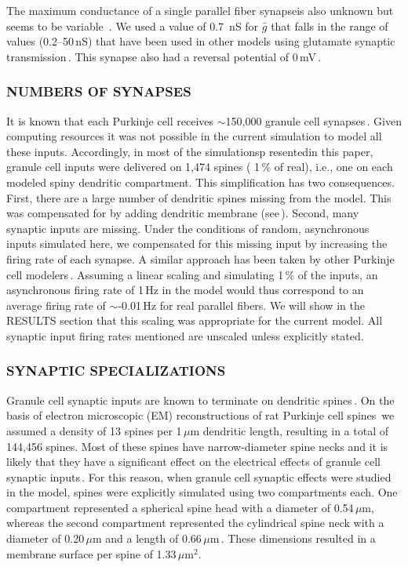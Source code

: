 \documentclass[12pt]{article}
\begin{document}
The maximum conductance of a
single parallel fiber synapseis also unknown but seems to be variable
\,\cite{Hirano:1986fv, Ito:1989dz}. We used a value of 0.7\,
nS for $\bar g$ that falls in the range of values (0.2--50\,nS) that have been
used in other models using glutamate synaptic transmission\,\cite{R:1989cr, W:1991qa, Miller:1985mi, Rapp-M:1992kx, Wehmeier:1989pi, Wilson:1989ff, Zador:1990lh}.
 This synapse also had a reversal
potential of 0\,mV\,\cite{Cull-Candy:1989oq, Mayer:1987kl}.

\subsubsection*{NUMBERS OF SYNAPSES}

It is known that each Purkinje cell receives
$\sim$150,000 granule cell synapses\,\cite{Harvey:1991xz}.
Given computing resources it was not possible in the
current simulation to model all these inputs. Accordingly, in most
of the simulationsp resentedin this paper, granule cell inputs were
delivered on 1,474 spines ( 1\,\% of real), i.e., one on each modeled
spiny dendritic compartment. This simplification has two consequences.
First, there are a large number of dendritic spines missing
from the model. This was compensated for by adding dendritic
membrane (see\,\cite{R:1989cr, Rapp-M:1992kx}).
Second, many synaptic inputs are missing. Under the conditions
of random, asynchronous inputs simulated here, we compensated
for this missing  input by increasing the firing rate of each synapse.
A similar approach has been taken by other Purkinje cell modelers\,\cite{Rapp-M:1992kx}.
Assuming a linear scaling and simulating 1\,\%
of the inputs, an asynchronous firing rate of 1\,Hz in the model
would thus correspond to an average firing rate of $\sim$-0.01\,Hz for
real parallel fibers. We will show in the RESULTS section that this
scaling was appropriate for the current model. All synaptic input
firing rates mentioned are unscaled unless explicitly stated.

\subsubsection*{SYNAPTIC SPECIALIZATIONS}

Granule cell synaptic inputs are
known to terminate on dendritic spines\,\cite{Harvey:1991xz, Palay:1974fk}.
On the basis of electron microscopic
(EM) reconstructions of rat Purkinje cell spines\,\cite{M:1988bh}
we assumed a density of 13 spines per 1\,$\mu$m
dendritic length, resulting in a total of 144,456 spines. Most of
these spines have narrow-diameter spine necks and it is likely that
they have a significant effect on the electrical effects of granule cell
synaptic inputs\,\cite{Rall:1990tg}. For this reason, when
granule cell synaptic effects were studied in the model, spines were
explicitly simulated using two compartments each. One compartment
represented a spherical spine head with a diameter of 0.54\,$\mu$m,
whereas the second compartment represented the cylindrical
spine neck with a diameter of 0.20\,$\mu$m and a length of 0.66\,$\mu$m\,\cite{M:1988bh}. These dimensions resulted in a membrane
surface per spine of 1.33\,$\mu$m$^2$.
\end{document}
